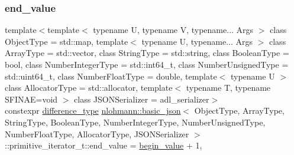 \subsubsection{\texorpdfstring{end\+\_\+value}{end\_value}}
{\footnotesize\ttfamily template$<$template$<$ typename U, typename V, typename... Args $>$ class Object\+Type = std\+::map, template$<$ typename U, typename... Args $>$ class Array\+Type = std\+::vector, class String\+Type  = std\+::string, class Boolean\+Type  = bool, class Number\+Integer\+Type  = std\+::int64\+\_\+t, class Number\+Unsigned\+Type  = std\+::uint64\+\_\+t, class Number\+Float\+Type  = double, template$<$ typename U $>$ class Allocator\+Type = std\+::allocator, template$<$ typename T, typename S\+F\+I\+N\+A\+E=void $>$ class J\+S\+O\+N\+Serializer = adl\+\_\+serializer$>$ \\
constexpr \hyperlink{classnlohmann_1_1basic__json_afe7c1303357e19cea9527af4e9a31d8f}{difference\+\_\+type} \hyperlink{classnlohmann_1_1basic__json}{nlohmann\+::basic\+\_\+json}$<$ Object\+Type, Array\+Type, String\+Type, Boolean\+Type, Number\+Integer\+Type, Number\+Unsigned\+Type, Number\+Float\+Type, Allocator\+Type, J\+S\+O\+N\+Serializer $>$\+::primitive\+\_\+iterator\+\_\+t\+::end\+\_\+value = \hyperlink{classnlohmann_1_1basic__json_1_1primitive__iterator__t_ac6aac2e2de4c7e5a10694ff173ac5f31}{begin\+\_\+value} + 1\hspace{0.3cm}{\ttfamily [static]}, {\ttfamily [private]}}

\mbox{\label{classnlohmann_1_1basic__json_1_1primitive__iterator__t_abe60fb63dd56044712ece9d9826a4af6}} 
